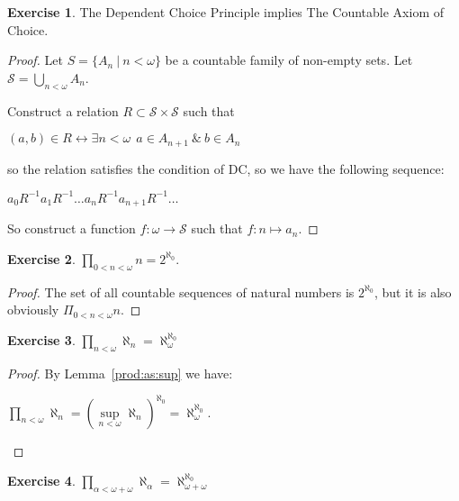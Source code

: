 \documentclass[8pt]{article}
\theoremstyle{definition}
\theoremstyle{definition}
\theoremstyle{definition}
\theoremstyle{definition}
\theoremstyle{definition}
\theoremstyle{definition}
\theoremstyle{definition}
\theoremstyle{definition}
\theoremstyle{definition}
\theoremstyle{definition}
\theoremstyle{definition}
\theoremstyle{definition}
\theoremstyle{definition}
\newtheorem{exercise}{Exercise}[section]
\theoremstyle{definition}
\theoremstyle{question}
\begin{document}
\begin{exercise}
  The Dependent Choice Principle implies The Countable Axiom of Choice.
\end{exercise}

\begin{proof}
  Let $S = \{ A_n \: | \: n < \omega \}$ be a countable family of non-empty sets. 
  Let $\mathcal{S} = \bigcup \limits_{n < \omega} A_n$.
  
  Construct a relation $R \subset \mathcal{S} \times \mathcal{S}$ such that
  \begin{center}
    $(a, b) \in R \leftrightarrow \exists n < \omega \:\: a \in A_{n + 1} \: \& \: b \in A_n$
  \end{center}
  so the relation satisfies the condition of DC, so we have the following sequence:
  
  \begin{center}
    $a_0 R^{-1} a_1 R^{-1} \dots a_n R^{-1} a_{n + 1} R^{-1} \dots $
  \end{center}

  So construct a function $f : \omega \to \mathcal{S}$ such that $f : n \mapsto a_n$.
\end{proof}

\begin{exercise}
  $\prod \limits_{0 < n < \omega} n = 2^{\aleph_0}$.
\end{exercise}

\begin{proof}
  The set of all countable sequences of natural numbers is $2^{\aleph_0}$, 
  but it is also obviously $\Pi_{0 < n < \omega} n$.
\end{proof}

\begin{exercise}
  $\prod \limits_{n < \omega} \aleph_n = \aleph_{\omega}^{\aleph_0}$
\end{exercise}

\begin{proof}
  By Lemma~\ref{prod:as:sup} we have:
  \begin{center}
  $\prod \limits_{n < \omega} \aleph_n = (\sup \limits_{n < \omega} \aleph_n)^{\aleph_0} = \aleph_{\omega}^{\aleph_0}$.
  \end{center}
\end{proof}

\begin{exercise}
  $\prod \limits_{\alpha < \omega + \omega} \aleph_{\alpha} = \aleph^{\aleph_0}_{\omega + \omega}$
\end{exercise}
\end{document}
